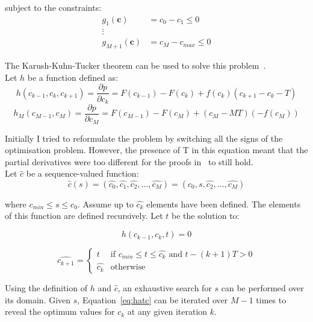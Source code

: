 subject to the constraints:
\begin{equation}
\begin{aligned}
g_1(\textbf{c}) &= c_0 - c_1 \le 0 \\
\vdots \\
g_{M+1}(\textbf{c}) &= c_M - c_{max} \le 0
\end{aligned}
\end{equation}

The Karush-Kuhn-Tucker theorem can be used to solve this problem~\cite{kkt}. \\

Let $h$ be a function defined as:
\begin{dmath}
\label{eq:h1}
h(c_{k-1}, c_k, c_{k+1}) = \dfrac{\partial p}{\partial c_k}
= F(c_{k-1}) - F(c_k) + f(c_k)(c_{k+1} - c_k - T)
\end{dmath}
\begin{dmath}
h_M(c_{M-1}, c_M) = \dfrac{\partial p}{\partial c_M}
= F(c_{M-1}) - F(c_M) + (c_M - MT)(-f(c_M))
\end{dmath}

Initially I tried to reformulate the problem by switching all the signs of the optimisation problem. However, the presence of T in this equation meant that the partial derivatives were too different for the proofs in~\cite{dutch} to still hold. \\

Let $\hat{c}$ be a sequence-valued function:
\begin{equation}
\label{eq:hatc}
\hat{c}(s) = (\hat{c_0}, \hat{c_1}, \hat{c_2},...,\hat{c_M}) = (c_0, s, \hat{c_2},...,\hat{c_M})
\end{equation}

where $c_{min} \le s \le c_0$. Assume up to $\hat{c_k}$ elements have been defined. The elements of this function are defined recursively. Let $t$ be the solution to:

\begin{equation}
h(c_{k-1}, c_k, t) = 0
\end{equation}

\begin{equation}
\hat{c_{k+1}} =
\begin{cases}
t & \mbox{if } c_{min} \le t \le \hat{c_k} \mbox{ and } t-(k+1)T > 0 \\
\hat{c_k} & \mbox{otherwise}
\end{cases}
\end{equation}

Using the definition of $h$ and $\hat{c}$, an exhaustive search for $s$ can be performed over its domain. Given $s$, Equation~\ref{eq:hatc} can be iterated over $M-1$ times to reveal the optimum values for $c_k$ at any given iteration $k$. \\

